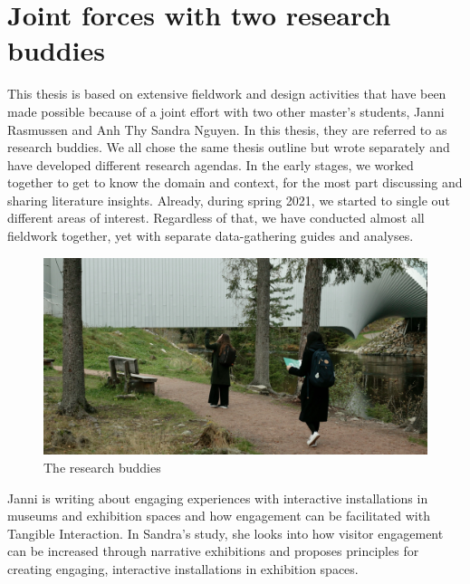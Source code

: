 \section{Joint forces with two research buddies}
This thesis is based on extensive fieldwork and design activities that have been made possible because of a joint effort with two other master's students, Janni Rasmussen and Anh Thy Sandra Nguyen. In this thesis, they are referred to as research buddies. We all chose the same thesis outline but wrote separately and have developed different research agendas. In the early stages, we worked together to get to know the domain and context, for the most part discussing and sharing literature insights. Already, during spring 2021, we started to single out different areas of interest. Regardless of that, we have conducted almost all fieldwork together, yet with separate data-gathering guides and analyses.

\begin{figure}[H]
\includegraphics[width=12cm]{pictures/methodology/buddies.JPG}
\caption{The research buddies}
\centering 
\end{figure}

Janni is writing about engaging experiences with interactive installations in museums and exhibition spaces and how engagement can be facilitated with Tangible Interaction. In Sandra's study, she looks into how visitor engagement can be increased through narrative exhibitions and proposes principles for creating engaging, interactive installations in exhibition spaces.


